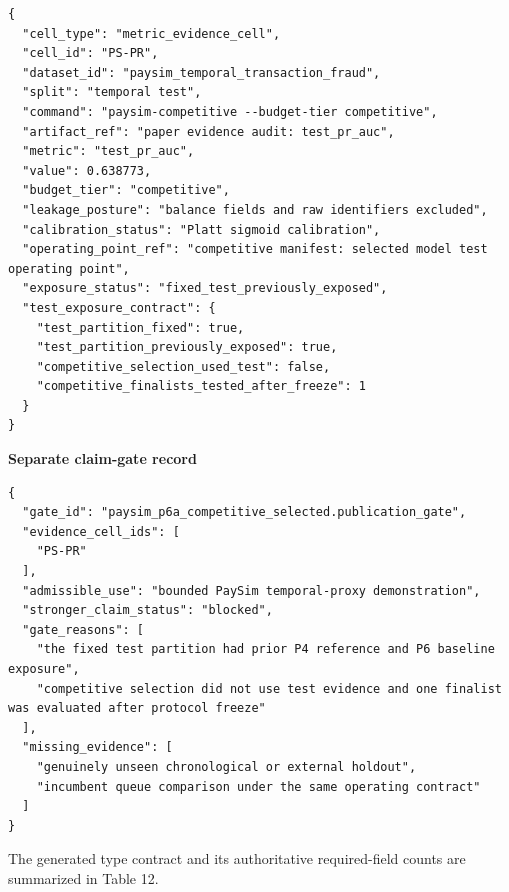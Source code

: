 \documentclass[11pt]{article}
\begin{document}
\begin{Verbatim}[frame=single,framesep=6pt,fontsize=\footnotesize,breaklines=true,breakanywhere=true,breaksymbolleft={}]
{
  "cell_type": "metric_evidence_cell",
  "cell_id": "PS-PR",
  "dataset_id": "paysim_temporal_transaction_fraud",
  "split": "temporal test",
  "command": "paysim-competitive --budget-tier competitive",
  "artifact_ref": "paper evidence audit: test_pr_auc",
  "metric": "test_pr_auc",
  "value": 0.638773,
  "budget_tier": "competitive",
  "leakage_posture": "balance fields and raw identifiers excluded",
  "calibration_status": "Platt sigmoid calibration",
  "operating_point_ref": "competitive manifest: selected model test operating point",
  "exposure_status": "fixed_test_previously_exposed",
  "test_exposure_contract": {
    "test_partition_fixed": true,
    "test_partition_previously_exposed": true,
    "competitive_selection_used_test": false,
    "competitive_finalists_tested_after_freeze": 1
  }
}
\end{Verbatim}


\textbf{Separate claim-gate record}

\begin{Verbatim}[frame=single,framesep=6pt,fontsize=\footnotesize,breaklines=true,breakanywhere=true,breaksymbolleft={}]
{
  "gate_id": "paysim_p6a_competitive_selected.publication_gate",
  "evidence_cell_ids": [
    "PS-PR"
  ],
  "admissible_use": "bounded PaySim temporal-proxy demonstration",
  "stronger_claim_status": "blocked",
  "gate_reasons": [
    "the fixed test partition had prior P4 reference and P6 baseline exposure",
    "competitive selection did not use test evidence and one finalist was evaluated after protocol freeze"
  ],
  "missing_evidence": [
    "genuinely unseen chronological or external holdout",
    "incumbent queue comparison under the same operating contract"
  ]
}
\end{Verbatim}


The generated type contract and its authoritative required-field counts are summarized in Table 12.
\end{document}
